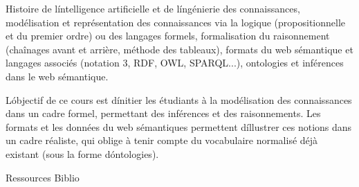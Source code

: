 {Histoire de l\'intelligence artificielle et de l\'ingénierie des connaissances,
modélisation et représentation des connaissances via la logique
(propositionnelle et du premier ordre) ou des langages formels,
formalisation du raisonnement (chaînages avant et arrière, méthode des
tableaux), formats du web sémantique et langages associés (notation 3,
RDF, OWL, SPARQL...), ontologies et inférences dans le web sémantique.
} 
{} 
{\begin{itemize} 
  \ObjItem L\'objectif de ce cours est d\'initier les étudiants à la modélisation des
connaissances dans un cadre formel, permettant des inférences et des
raisonnements.
  \ObjItem  Les formats et les données du web sémantiques
permettent d\'illustrer ces notions dans un cadre réaliste, qui oblige à tenir
compte du vocabulaire normalisé déjà existant (sous la forme
d\'ontologies).
\end{itemize} 
} 
{Ressources} 
{Biblio} 
 
\vfill

